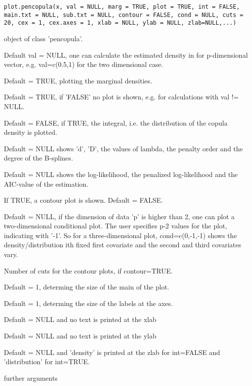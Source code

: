\documentclass[a4paper]{book}
\begin{document}
%
\begin{Usage}
\begin{verbatim}
plot.pencopula(x, val = NULL, marg = TRUE, plot = TRUE, int = FALSE,
main.txt = NULL, sub.txt = NULL, contour = FALSE, cond = NULL, cuts =
20, cex = 1, cex.axes = 1, xlab = NULL, ylab = NULL, zlab=NULL,...)
\end{verbatim}
\end{Usage}
%
\begin{Arguments}
\begin{ldescription}
\item[\code{x}] object of class 'pencopula'.
\item[\code{val}] Default val = NULL, one can calculate the estimated density
in for p-dimensional vector, e.g. val=c(0.5,1) for the two
dimensional case.
\item[\code{marg}] Default = TRUE, plotting the marginal densities.
\item[\code{plot}] Default = TRUE, if 'FALSE' no plot is shown, e.g. for
calculations with val != NULL.
\item[\code{int}] Default = FALSE, if TRUE, the integral, i.e. the distribution of
the copula density is plotted.
\item[\code{main.txt}] Default = NULL shows 'd', 'D', the values of lambda,
the penalty order and the degree of the B-splines.
\item[\code{sub.txt}] Default = NULL shows the log-likelihood, the penalized
log-likelihood and the AIC-value of the estimation.
\item[\code{contour}] If TRUE, a contour plot is shown. Default = FALSE.
\item[\code{cond}] Default = NULL, if the dimension of data 'p' is higher
than 2, one can plot a two-dimensional conditional plot. The user
specifies p-2 values for the plot, indicating with '-1'. So for a
three-dimensional plot, cond=c(0,-1,-1) shows the
density/distribution  ith fixed first covariate and the second
and third covariates vary.
\item[\code{cuts}] Number of cuts for the contour plots, if contour=TRUE.
\item[\code{cex}] Default = 1, determing the size of the main of the plot.
\item[\code{cex.axes}] Default = 1, determing the size of the labels at the axes.
\item[\code{xlab}] Default = NULL and no text is printed at the xlab
\item[\code{ylab}] Default = NULL and no text is printed at the ylab
\item[\code{zlab}] Default = NULL and 'density' is printed at the zlab for
int=FALSE and 'distribution' for int=TRUE.
\item[\code{...}] further arguments
\end{ldescription}
\end{Arguments}
\end{document}
